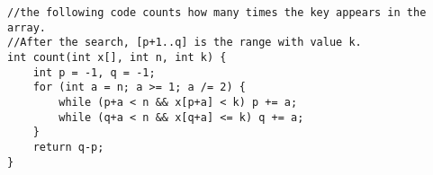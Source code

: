 \begin{verbatim}
//the following code counts how many times the key appears in the array. 
//After the search, [p+1..q] is the range with value k.
int count(int x[], int n, int k) {
    int p = -1, q = -1;
    for (int a = n; a >= 1; a /= 2) {
        while (p+a < n && x[p+a] < k) p += a;
        while (q+a < n && x[q+a] <= k) q += a;
    }
    return q-p;
}
\end{verbatim}
